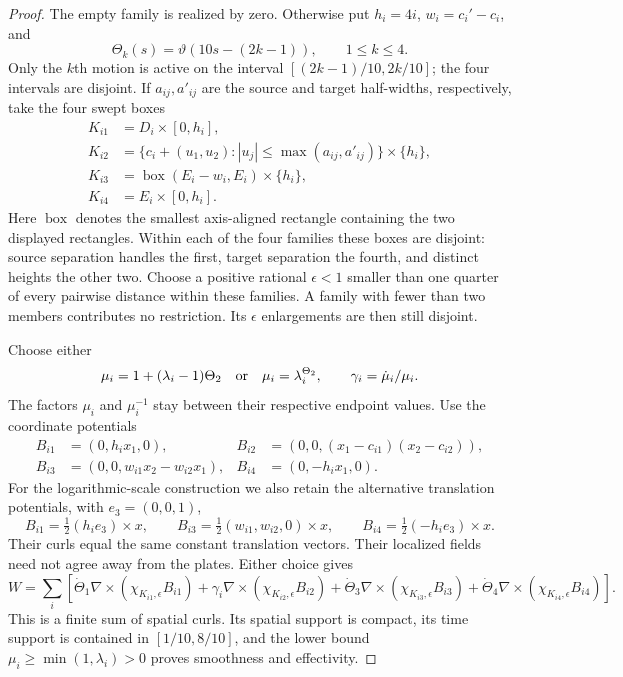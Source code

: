 \begin{proof}\label{ba:four-stage-proof}
The empty family is realized by zero.  Otherwise put $h_i=4i$,
$w_i=c_i'-c_i$, and
\[
 \Theta_k(s)=\vartheta(10s-(2k-1)),\qquad 1\le k\le4.
\]
Only the $k$th motion is active on the interval
$[(2k-1)/10,2k/10]$; the four intervals are disjoint.  If
$a_{ij},a'_{ij}$ are the source and target half-widths, respectively,
take the four swept boxes
\[
 \begin{aligned}
 K_{i1}&=D_i\times[0,h_i],\\
 K_{i2}&=\{c_i+(u_1,u_2):|u_j|\le\max(a_{ij},a'_{ij})\}
                                      \times\{h_i\},\\
 K_{i3}&=\operatorname{box}(E_i-w_i,E_i)\times\{h_i\},\\
 K_{i4}&=E_i\times[0,h_i].
 \end{aligned}
\]
Here $\operatorname{box}$ denotes the smallest axis-aligned rectangle
containing the two displayed rectangles.  Within each of the four
families these boxes are disjoint: source separation handles the first,
target separation the fourth, and distinct heights the other two.
Choose a positive rational $\epsilon<1$ smaller than one quarter of
every pairwise distance within these families.  A family with fewer than
two members contributes no restriction.  Its $\epsilon$ enlargements
are then still disjoint.

Choose either
\[
 \mu_i=1+(\lambda_i-1)\Theta_2
 \quad\hbox{or}\quad \mu_i=\lambda_i^{\Theta_2},
 \qquad \gamma_i=\dot\mu_i/\mu_i.
\]
The factors $\mu_i$ and $\mu_i^{-1}$ stay between their respective
endpoint values.  Use the coordinate potentials
\[
 \begin{aligned}
 B_{i1}&=(0,h_i x_1,0),&
 B_{i2}&=(0,0,(x_1-c_{i1})(x_2-c_{i2})),\\
 B_{i3}&=(0,0,w_{i1}x_2-w_{i2}x_1),&
 B_{i4}&=(0,-h_i x_1,0).
 \end{aligned}
\]
For the logarithmic-scale construction we also retain the alternative
translation potentials, with $e_3=(0,0,1)$,
\[
 B_{i1}=\tfrac12(h_ie_3)\times x,\qquad
 B_{i3}=\tfrac12(w_{i1},w_{i2},0)\times x,\qquad
 B_{i4}=\tfrac12(-h_ie_3)\times x.
\]
Their curls equal the same constant translation vectors.  Their localized
fields need not agree away from the plates.  Either choice gives
\[
 W=\sum_i\left[
 \dot\Theta_1\nabla\times(\chi_{K_{i1},\epsilon}B_{i1})
 +\gamma_i\nabla\times(\chi_{K_{i2},\epsilon}B_{i2})
 +\dot\Theta_3\nabla\times(\chi_{K_{i3},\epsilon}B_{i3})
 +\dot\Theta_4\nabla\times(\chi_{K_{i4},\epsilon}B_{i4})\right].
\]
This is a finite sum of spatial curls.  Its spatial support is compact,
its time support is contained in $[1/10,8/10]$, and the lower bound
$\mu_i\ge\min(1,\lambda_i)>0$ proves smoothness and effectivity.


\end{proof}

